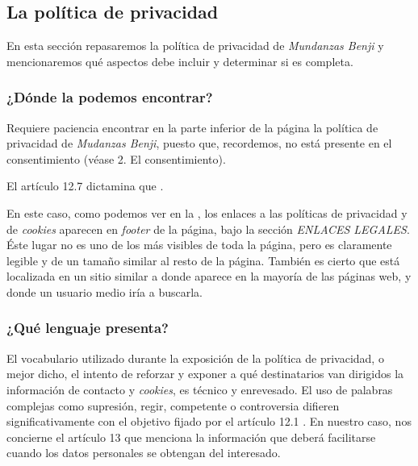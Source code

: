 \subsection{La política de privacidad}
En esta sección repasaremos la política de privacidad de \textit{Mundanzas Benji} y mencionaremos qué aspectos debe incluir y determinar si es completa.

\subsubsection{¿Dónde la podemos encontrar?}
Requiere paciencia encontrar en la parte inferior de la página la política de privacidad de \textit{Mudanzas Benji}, puesto que, recordemos, no está presente en el consentimiento (véase 2. El consentimiento).

El artículo 12.7 dictamina que . 

En este caso, como podemos ver en la , los enlaces a las políticas de privacidad y de \textit{cookies} aparecen en \textit{footer} de la página, bajo la sección \textit{ENLACES LEGALES}. Éste lugar no es uno de los más visibles de toda la página, pero es claramente legible y de un tamaño similar al resto de la página.
También es cierto que está localizada en un sitio similar a donde aparece en la mayoría de las páginas web, y donde un usuario medio iría a buscarla.



\subsubsection{¿Qué lenguaje presenta?}
El vocabulario utilizado durante la exposición de la política de privacidad, o mejor dicho, el intento de reforzar y exponer a qué destinatarios van dirigidos la información de contacto y \textit{cookies}, es técnico y enrevesado. El uso de palabras complejas como supresión, regir, competente o controversia difieren significativamente con el objetivo fijado por el artículo 12.1 . En nuestro caso, nos concierne el artículo 13 que menciona la información que deberá facilitarse cuando los datos personales se obtengan del interesado.


